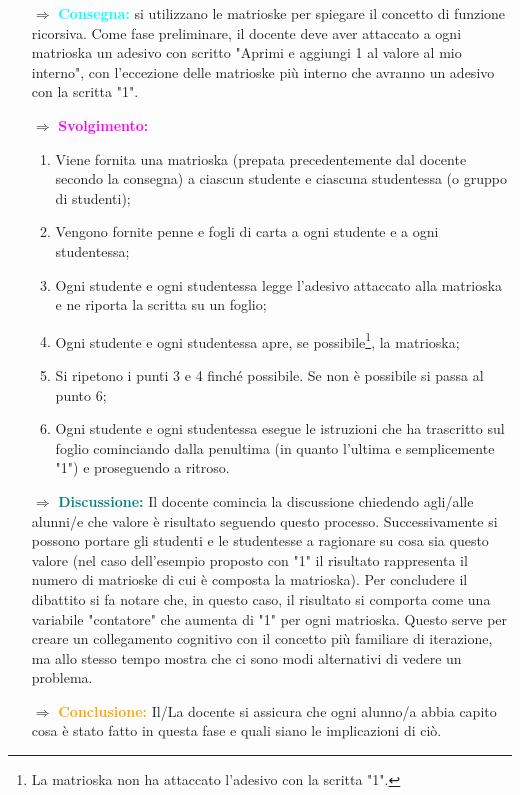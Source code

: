 \begin{itemize}
    \item [$\Rightarrow$] \textbf{\textcolor{cyan}{Consegna:}} si utilizzano le matrioske per spiegare 
    il concetto di funzione ricorsiva. Come fase preliminare, il docente deve aver attaccato a ogni matrioska 
    un adesivo con scritto "Aprimi e aggiungi 1 al valore al mio interno", con l'eccezione delle matrioske più interno che avranno
    un adesivo con la scritta "1".
    \item [$\Rightarrow$] \textbf{\textcolor{magenta}{Svolgimento:}}
    \begin{enumerate}
        \item Viene fornita una matrioska (prepata precedentemente dal docente secondo la consegna) a ciascun studente e ciascuna studentessa (o gruppo di studenti);
        \item Vengono fornite penne e fogli di carta a ogni studente e a ogni studentessa;
        \item Ogni studente e ogni studentessa legge l'adesivo attaccato alla matrioska e ne riporta la scritta
        su un foglio;
        \item Ogni studente e ogni studentessa apre, se possibile\footnote{La matrioska non ha attaccato l'adesivo con la scritta "1".},
        la matrioska;
        \item Si ripetono i punti 3 e 4 finché possibile. Se non è possibile si passa al punto 6;
        \item Ogni studente e ogni studentessa esegue le istruzioni che ha trascritto sul foglio cominciando dalla penultima (in quanto l'ultima e semplicemente "1")
        e proseguendo a ritroso.
    \end{enumerate}
    \item [$\Rightarrow$] \textbf{\textcolor{teal}{Discussione:}} Il docente comincia la discussione chiedendo agli/alle alunni/e 
    che valore è risultato seguendo questo processo. Successivamente si possono portare
    gli studenti e le studentesse a ragionare su cosa sia questo valore (nel caso dell'esempio proposto con "1" 
    il risultato rappresenta il numero di matrioske di cui è composta la matrioska). Per concludere il dibattito
    si fa notare che, in questo caso, il risultato si comporta come una variabile "contatore" che aumenta di "1"
    per ogni matrioska. Questo serve per creare un collegamento cognitivo con il concetto più familiare di
    iterazione, ma allo stesso tempo mostra che ci sono modi alternativi di vedere un problema.  
    \item [$\Rightarrow$] \textbf{\textcolor{orange}{Conclusione:}} Il/La docente si assicura che ogni
    alunno/a abbia capito cosa è stato fatto in questa fase e quali siano le implicazioni di ciò. 
\end{itemize}

